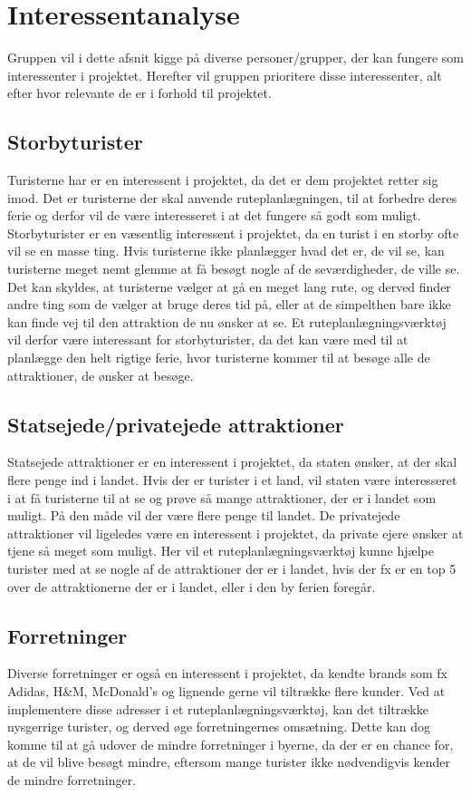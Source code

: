 \section{Interessentanalyse}

Gruppen vil i dette afsnit kigge på diverse personer/grupper, der kan fungere som interessenter i projektet. Herefter vil gruppen prioritere disse interessenter, alt efter hvor relevante de er i forhold til projektet.

\subsection{Storbyturister}
Turisterne har er en interessent i projektet, da det er dem projektet retter sig imod. Det er turisterne der skal anvende ruteplanlægningen, til at forbedre deres ferie og derfor vil de være interesseret i at det fungere så godt som muligt. 
Storbyturister er en væsentlig interessent i projektet, da en turist i en storby ofte vil se en masse ting. Hvis turisterne ikke planlægger hvad det er, de vil se, kan turisterne meget nemt glemme at få besøgt nogle af de seværdigheder, de ville se. Det kan skyldes, at turisterne vælger at gå en meget lang rute, og derved finder andre ting som de vælger at bruge deres tid på, eller at de simpelthen bare ikke kan finde vej til den attraktion de nu ønsker at se. Et ruteplanlægningsværktøj vil derfor være interessant for storbyturister, da det kan være med til at planlægge den helt rigtige ferie, hvor turisterne kommer til at besøge alle de attraktioner, de ønsker at besøge.

\subsection{Statsejede/privatejede attraktioner}
Statsejede attraktioner er en interessent i projektet, da staten ønsker, at der skal flere penge ind i landet. Hvis der er turister i et land, vil staten være interesseret i at få turisterne til at se og prøve så mange attraktioner, der er i landet som muligt. På den måde vil der være flere penge til landet. 
De privatejede attraktioner vil ligeledes være en interessent i projektet, da private ejere ønsker at tjene så meget som muligt. 
Her vil et ruteplanlægningsværktøj kunne hjælpe turister med at se nogle af de attraktioner der er i landet, hvis der fx er en top 5 over de attraktionerne der er i landet, eller i den by ferien foregår.

\subsection{Forretninger} 
Diverse forretninger er også en interessent i projektet, da kendte brands som fx Adidas, H\&M, McDonald’s og lignende gerne vil tiltrække flere kunder. Ved at implementere disse adresser i et ruteplanlægningsværktøj, kan det tiltrække nysgerrige turister, og derved øge forretningernes omsætning. 
Dette kan dog komme til at gå udover de mindre forretninger i byerne, da der er en chance for, at de vil blive besøgt mindre, eftersom mange turister ikke nødvendigvis kender de mindre forretninger. 

